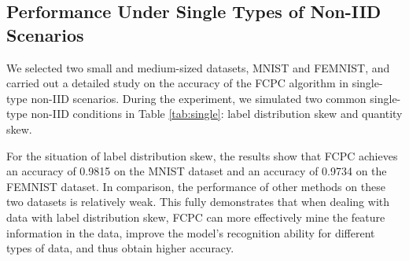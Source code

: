\documentclass[journal,twoside,web]{ieeecolor}
\begin{document}




\subsection{Performance Under Single Types of Non-IID Scenarios}

We selected two small and medium-sized datasets, MNIST\cite{MNIST} and FEMNIST, and carried out a detailed study on the accuracy of the FCPC algorithm in single-type non-IID scenarios.
During the experiment, we simulated two common single-type non-IID conditions in Table \ref{tab:single}: label distribution skew and quantity skew. 

For the situation of label distribution skew, the results show that FCPC achieves an accuracy of 0.9815 on the MNIST dataset and an accuracy of 0.9734 on the FEMNIST dataset. In comparison, the performance of other methods on these two datasets is relatively weak. This fully demonstrates that when dealing with data with label distribution skew, FCPC can more effectively mine the feature information in the data, improve the model's recognition ability for different types of data, and thus obtain higher accuracy.
\end{document}
